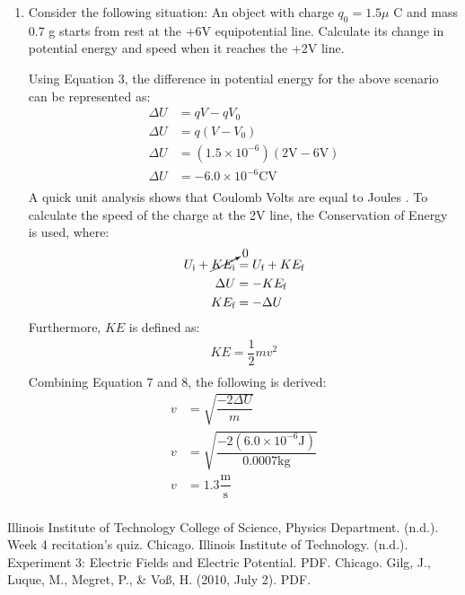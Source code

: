 \documentclass [12pt, letterpaper, twoside] {article}
\begin{document}
\begin{enumerate}
  \item Consider the following situation: An object with charge \(q_{0} = 1.5\mu\) C and mass 0.7 g starts from rest at the +6V equipotential line. Calculate its change in potential energy and speed when it reaches the +2V line.

Using Equation 3, the difference in potential energy for the above scenario can be represented as:
\begin{equation*}
  \begin{split}
    \Delta{U} &= qV-qV_{0} \\
    \Delta{U} &= q(V-V_{0}) \\
    \Delta{U} &= (1.5\times{10^{-6}})(2\text{V}-6\text{V}) \\
    \Delta{U} &= -6.0\times{10^{-6}} \text{CV} \\
  \end{split}
\end{equation*}
A quick unit analysis shows that Coulomb Volts are equal to Joules \cite{quiz2}.
To calculate the speed of the charge at the 2V line, the Conservation of Energy is used, where:
\begin{equation}
  \begin{split}
    U_{\text{i}} + \cancelto{0}{KE_{\text{i}}} &= U_{\text{f}} + KE_{\text{f}} \\
    \Delta{U} &= -KE_{\text{f}} \\
    KE_{\text{f}} &= -\Delta{U} \\
  \end{split}
\end{equation}
Furthermore, \(KE\) is defined as:
\begin{equation}
  \begin{split}
    KE = \dfrac{1}{2}mv^2 \\
  \end{split}
\end{equation}
Combining Equation 7 and 8, the following is derived:
\begin{equation*}
  \begin{split}
    v &= \sqrt{\dfrac{-2\Delta{U}}{m}} \\
    v &= \sqrt{\dfrac{-2(6.0\times{10^{-6}}\text{J})}{0.0007\text{kg}}} \\
    v &= 1.3 \dfrac{\text{m}}{\text{s}} \\
  \end{split}
\end{equation*}

\end {enumerate}

  Illinois Institute of Technology College of Science, Physics Department. (n.d.). Week 4 recitation's quiz. Chicago.
  Illinois Institute of Technology. (n.d.). Experiment 3: Electric Fields and Electric Potential. PDF. Chicago.
  Gilg, J., Luque, M., Megret, P., \& Voß, H. (2010, July 2). PDF.
\end{document}
